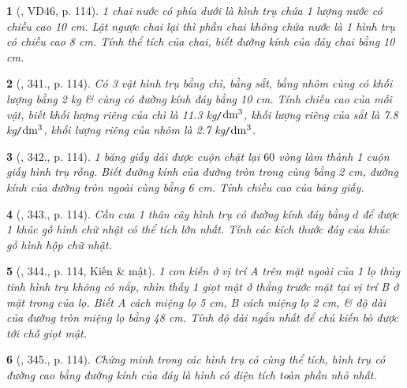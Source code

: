 \documentclass{article}
\newtheorem{baitoan}{}
\begin{document}
\begin{baitoan}[\cite{Binh_Toan_9_tap_2}, VD46, p. 114]
	1 chai nước có phía dưới là hình trụ chứa 1 lượng nước có chiều cao {\rm10 cm}. Lật ngược chai lại thì phần chai không chứa nước là 1 hình trụ có chiều cao {\rm8 cm}. Tính thể tích của chai, biết đường kính của đáy chai bằng {\rm10 cm}.
\end{baitoan}

\begin{baitoan}[\cite{Binh_Toan_9_tap_2}, 341., p. 114]
	Có 3 vật hình trụ bằng chì, bằng sắt, bằng nhôm cùng có khối lượng bằng {\rm2 kg} \& cùng có đường kính đáy bằng {\rm10 cm}. Tính chiều cao của mỗi vật, biết khối lượng riêng của chì là {\rm11.3 kg{\tt/}$\rm dm^3$}, khối lượng riêng của sắt là {\rm7.8 kg{\tt/}$\rm dm^3$}, khối lượng riêng của nhôm là {\rm2.7 kg{\tt/}$\rm dm^3$}.
\end{baitoan}

\begin{baitoan}[\cite{Binh_Toan_9_tap_2}, 342., p. 114]
	1 băng giấy dải được cuộn chặt lại $60$ vòng làm thành 1 cuộn giấy hình trụ rỗng. Biết đường kính của đường tròn trong cùng bằng {\rm2 cm}, đường kính của đường tròn ngoài cùng bằng {\rm6 cm}. Tính chiều cao của băng giấy.
\end{baitoan}

\begin{baitoan}[\cite{Binh_Toan_9_tap_2}, 343., p. 114]
	Cần cưa 1 thân cây hình trụ có đường kính đáy bằng $d$ để được 1 khúc gỗ hình chữ nhật có thể tích lớn nhất. Tính các kích thước đáy của khúc gỗ hình hộp chữ nhật.
\end{baitoan}

\begin{baitoan}[\cite{Binh_Toan_9_tap_2}, 344., p. 114, Kiến \& mật]
	1 con kiến ở vị trí A trên mặt ngoài của 1 lọ thủy tinh hình trụ không có nắp, nhìn thấy 1 giọt mật ở thẳng trước mặt tại vị trí B ở mặt trong của lọ. Biết A cách miệng lọ {\rm5 cm}, B cách miệng lọ {\rm2 cm}, \& độ dài của đường tròn miệng lọ bằng {\rm48 cm}. Tính độ dài ngắn nhất để chú kiến bò được tới chỗ giọt mật.
\end{baitoan}

\begin{baitoan}[\cite{Binh_Toan_9_tap_2}, 345., p. 114]
	Chứng minh trong các hình trụ có cùng thể tích, hình trụ có đường cao bằng đường kính của đáy là hình có diện tích toàn phần nhỏ nhất.
\end{baitoan}

\end{document}

